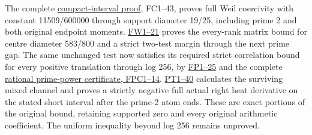 \documentclass[
  10pt,
  a4paper,
]{article}
\begin{document}
The complete \href{FIRST_PRIME_FULL_WEIL_COERCIVITY.md}{compact-interval
proof}, FC1--43, proves full Weil coercivity with constant 11509/600000
through support diameter 19/25, including prime 2 and both original
endpoint moments. \href{FIRST_PRIME_WINDOW_BOUND.md}{FW1--21} proves the
every-rank matrix bound for centre diameter 583/800 and a strict
two-test margin through the next prime gap. The same unchanged test now
satisfies its required strict correlation bound for every positive
translation through log 256, by
\href{FINITE_PRIME_WINDOW_EXTENSION.md}{FP1--25} and the complete
\href{FINITE_PRIME_WINDOW_COEFFICIENT_CERTIFICATE.md}{rational
prime-power certificate, FPC1--14}.
\href{PRIME_TWO_HEAT_TAIL_DERIVATION.md}{PT1--40} calculates the
surviving mixed channel and proves a strictly negative full actual right
heat derivative on the stated short interval after the prime-2 atom
ends. These are exact portions of the original bound, retaining
supported zero and every original arithmetic coefficient. The uniform
inequality beyond log 256 remains unproved.
\end{document}
